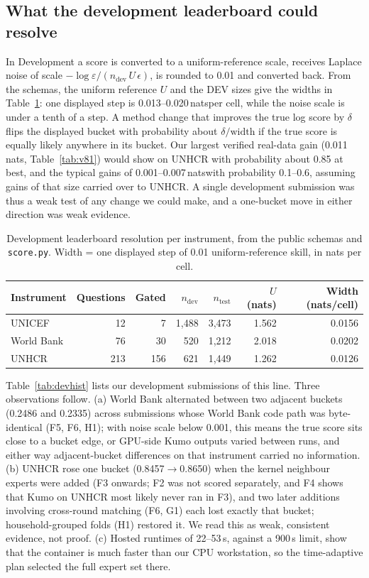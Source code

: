 \documentclass[10pt]{article}
\newcommand{\nats}{\,nats}
\begin{document}
\subsection{What the development leaderboard could resolve}
\label{sec:leaderboard}
In Development a score is converted to a uniform-reference scale, receives Laplace noise of scale $-\log\varepsilon/(n_{\mathrm{dev}}\,U\,\epsilon)$, is rounded to 0.01 and converted back. From the schemas, the uniform reference $U$ and the DEV sizes give the widths in Table~\ref{tab:buckets}: one displayed step is 0.013--0.020\nats per cell, while the noise scale is under a tenth of a step. A method change that improves the true log score by $\delta$ flips the displayed bucket with probability about $\delta/\text{width}$ if the true score is equally likely anywhere in its bucket. Our largest verified real-data gain (0.011\nats, Table~\ref{tab:v81}) would show on UNHCR with probability about 0.85 at best, and the typical gains of 0.001--0.007\nats with probability 0.1--0.6, assuming gains of that size carried over to UNHCR. A single development submission was thus a weak test of any change we could make, and a one-bucket move in either direction was weak evidence.

\begin{table}[t]
\centering\small
\caption{Development leaderboard resolution per instrument, from the public schemas and \texttt{score.py}. Width = one displayed step of 0.01 uniform-reference skill, in nats per cell.}
\label{tab:buckets}
\begin{tabular}{lrrrrrr}
\toprule
Instrument & Questions & Gated & $n_{\mathrm{dev}}$ & $n_{\mathrm{test}}$ & $U$ (nats) & Width (nats/cell) \\
\midrule
UNICEF & 12 & 7 & 1{,}488 & 3{,}473 & 1.562 & 0.0156 \\
World Bank & 76 & 30 & 520 & 1{,}212 & 2.018 & 0.0202 \\
UNHCR & 213 & 156 & 621 & 1{,}449 & 1.262 & 0.0126 \\
\bottomrule
\end{tabular}
\end{table}

Table~\ref{tab:devhist} lists our development submissions of this line. Three observations follow. (a) World Bank alternated between two adjacent buckets (0.2486 and 0.2335) across submissions whose World Bank code path was byte-identical (F5, F6, H1); with noise scale below 0.001, this means the true score sits close to a bucket edge, or GPU-side Kumo outputs varied between runs, and either way adjacent-bucket differences on that instrument carried no information. (b) UNHCR rose one bucket (0.8457$\to$0.8650) when the kernel neighbour experts were added (F3 onwards; F2 was not scored separately, and F4 shows that Kumo on UNHCR most likely never ran in F3), and two later additions involving cross-round matching (F6, G1) each lost exactly that bucket; household-grouped folds (H1) restored it. We read this as weak, consistent evidence, not proof. (c) Hosted runtimes of 22--53\,s, against a 900\,s limit, show that the container is much faster than our CPU workstation, so the time-adaptive plan selected the full expert set there.
\end{document}
